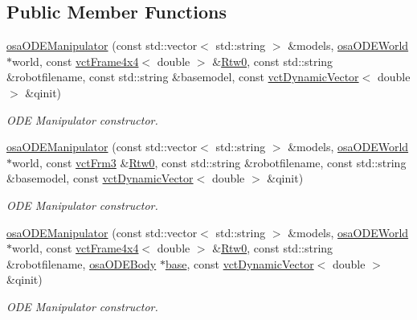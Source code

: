 \subsection*{Public Member Functions}
\begin{DoxyCompactItemize}
\item 
\hyperlink{classosa_o_d_e_manipulator_a07b1139498e822a3a2506b91b92d2afa}{osa\+O\+D\+E\+Manipulator} (const std\+::vector$<$ std\+::string $>$ \&models, \hyperlink{classosa_o_d_e_world}{osa\+O\+D\+E\+World} $\ast$world, const \hyperlink{classvct_frame4x4}{vct\+Frame4x4}$<$ double $>$ \&\hyperlink{classrob_manipulator_ab48d9d9a166bf252698bc35788ca6ad6}{Rtw0}, const std\+::string \&robotfilename, const std\+::string \&basemodel, const \hyperlink{classvct_dynamic_vector}{vct\+Dynamic\+Vector}$<$ double $>$ \&qinit)
\begin{DoxyCompactList}\small\item\em O\+D\+E Manipulator constructor. \end{DoxyCompactList}\item 
\hyperlink{classosa_o_d_e_manipulator_ab21797024ebad02a81d0b2add3b08e84}{osa\+O\+D\+E\+Manipulator} (const std\+::vector$<$ std\+::string $>$ \&models, \hyperlink{classosa_o_d_e_world}{osa\+O\+D\+E\+World} $\ast$world, const \hyperlink{vct_transformation_types_8h_a81feda0a02c2d1bc26e5553f409fed20}{vct\+Frm3} \&\hyperlink{classrob_manipulator_ab48d9d9a166bf252698bc35788ca6ad6}{Rtw0}, const std\+::string \&robotfilename, const std\+::string \&basemodel, const \hyperlink{classvct_dynamic_vector}{vct\+Dynamic\+Vector}$<$ double $>$ \&qinit)
\begin{DoxyCompactList}\small\item\em O\+D\+E Manipulator constructor. \end{DoxyCompactList}\item 
\hyperlink{classosa_o_d_e_manipulator_a3675eabc662208f7f5a7720abbcb9382}{osa\+O\+D\+E\+Manipulator} (const std\+::vector$<$ std\+::string $>$ \&models, \hyperlink{classosa_o_d_e_world}{osa\+O\+D\+E\+World} $\ast$world, const \hyperlink{classvct_frame4x4}{vct\+Frame4x4}$<$ double $>$ \&\hyperlink{classrob_manipulator_ab48d9d9a166bf252698bc35788ca6ad6}{Rtw0}, const std\+::string \&robotfilename, \hyperlink{classosa_o_d_e_body}{osa\+O\+D\+E\+Body} $\ast$\hyperlink{classosa_o_s_g_manipulator_a6c69fd718f80ec8c73a408f01d2819ef}{base}, const \hyperlink{classvct_dynamic_vector}{vct\+Dynamic\+Vector}$<$ double $>$ \&qinit)
\begin{DoxyCompactList}\small\item\em O\+D\+E Manipulator constructor. \end{DoxyCompactList}\item 

\end{DoxyCompactItemize}
